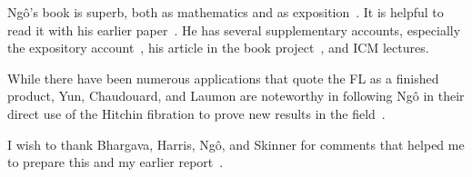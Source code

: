 \documentclass[brochure,english,12pt]{bourbaki}
\theoremstyle{plain}
\begin{document}
Ng\^o's book is superb, both as mathematics and as
exposition~\cite{NBC:2010}.  It is helpful to read it with his earlier
paper~\cite{NBC:2006}.  He has several supplementary accounts,
especially the expository account~\cite{NBC:report:2010}, his article in the book
project~\cite{NBC:abelian}, and ICM lectures.



While there have been numerous applications that quote the FL as a
finished product, Yun, Chaudouard, and Laumon are noteworthy in
following Ng\^o in their direct use of the Hitchin fibration to prove
new results in the field~\cite{Yun:2009}.


I wish to thank Bhargava, Harris, Ng\^o, and Skinner for comments that
helped me to prepare this and my earlier report~\cite{thales:NBC:2011}.
 

\raggedright

\end{document}
